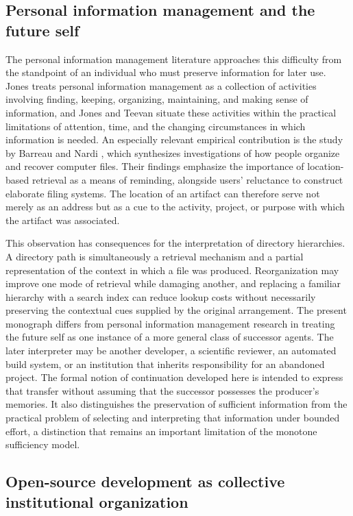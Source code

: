 \documentclass[11pt,twoside,openright]{book}
\theoremstyle{plain}
\theoremstyle{definition}
\theoremstyle{remark}
\begin{document}
\subsection*{Personal information management and the future self}

The personal information management literature approaches this difficulty from the standpoint of an individual who must preserve information for later use. Jones \cite{jones2007} treats personal information management as a collection of activities involving finding, keeping, organizing, maintaining, and making sense of information, and Jones and Teevan \cite{jonesteevan2007} situate these activities within the practical limitations of attention, time, and the changing circumstances in which information is needed. An especially relevant empirical contribution is the study by Barreau and Nardi \cite{barreau1995}, which synthesizes investigations of how people organize and recover computer files. Their findings emphasize the importance of location-based retrieval as a means of reminding, alongside users' reluctance to construct elaborate filing systems. The location of an artifact can therefore serve not merely as an address but as a cue to the activity, project, or purpose with which the artifact was associated.

This observation has consequences for the interpretation of directory hierarchies. A directory path is simultaneously a retrieval mechanism and a partial representation of the context in which a file was produced. Reorganization may improve one mode of retrieval while damaging another, and replacing a familiar hierarchy with a search index can reduce lookup costs without necessarily preserving the contextual cues supplied by the original arrangement. The present monograph differs from personal information management research in treating the future self as one instance of a more general class of successor agents. The later interpreter may be another developer, a scientific reviewer, an automated build system, or an institution that inherits responsibility for an abandoned project. The formal notion of continuation developed here is intended to express that transfer without assuming that the successor possesses the producer's memories. It also distinguishes the preservation of sufficient information from the practical problem of selecting and interpreting that information under bounded effort, a distinction that remains an important limitation of the monotone sufficiency model.

\subsection*{Open-source development as collective institutional organization}
\end{document}

